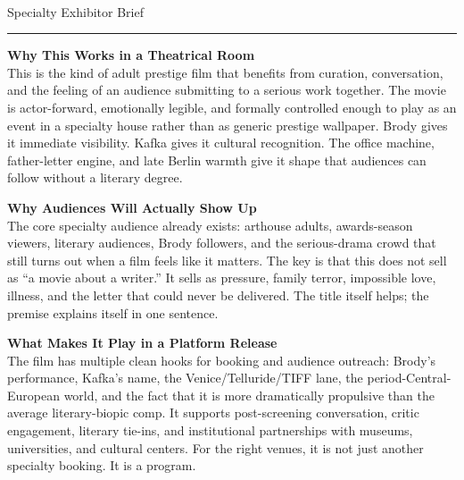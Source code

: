 \documentclass[11pt,letterpaper]{article}
\begin{document}
\begin{center}
{\Large\bfseries\sffamily \filmtitleupper}\\[3pt]
{\normalsize\sffamily\color{kafkagray} Specialty Exhibitor Brief}
\end{center}
\vspace{2pt}
\textcolor{sectionrule}{\rule{\textwidth}{0.5pt}}
\vspace{4pt}

\textbf{Why This Works in a Theatrical Room}\\
This is the kind of adult prestige film that benefits from curation, conversation, and the feeling of an audience submitting to a serious work together. The movie is actor-forward, emotionally legible, and formally controlled enough to play as an event in a specialty house rather than as generic prestige wallpaper. Brody gives it immediate visibility. Kafka gives it cultural recognition. The office machine, father-letter engine, and late Berlin warmth give it shape that audiences can follow without a literary degree.

\vspace{2pt}

\textbf{Why Audiences Will Actually Show Up}\\
The core specialty audience already exists: arthouse adults, awards-season viewers, literary audiences, Brody followers, and the serious-drama crowd that still turns out when a film feels like it matters. The key is that this does not sell as ``a movie about a writer.'' It sells as pressure, family terror, impossible love, illness, and the letter that could never be delivered. The title itself helps; the premise explains itself in one sentence.

\vspace{2pt}

\textbf{What Makes It Play in a Platform Release}\\
The film has multiple clean hooks for booking and audience outreach: Brody's performance, Kafka's name, the Venice/Telluride/TIFF lane, the period-Central-European world, and the fact that it is more dramatically propulsive than the average literary-biopic comp. It supports post-screening conversation, critic engagement, literary tie-ins, and institutional partnerships with museums, universities, and cultural centers. For the right venues, it is not just another specialty booking. It is a program.

\vspace{2pt}
\end{document}
